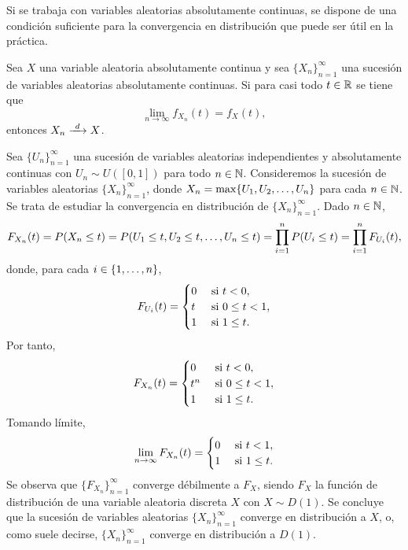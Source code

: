 \documentclass[a4paper, 11pt, extrafontsizes]{memoir}
\begin{document}
Si se trabaja con variables aleatorias absolutamente continuas, se dispone de una condición suficiente para la convergencia en distribución que puede ser útil en la práctica.

\begin{proposition}
    Sea $X$ una variable aleatoria absolutamente continua y sea $\{X_n\}_{n=1}^\infty$ una sucesión de variables aleatorias absolutamente continuas. Si para casi todo $t \in \mathbb R$ se tiene que
    \[\lim_{n \to \infty}f_{X_n}(t) = f_X(t),\]
    entonces $X_n \dconv X$.
\end{proposition}


\begin{example}
    Sea $\{U_n\}_{n=1}^\infty$ una sucesión de variables aleatorias independientes y absolutamente continuas con $U_n \sim U([0,1])$ para todo $n \in \mathbb N$. Consideremos la sucesión de variables aleatorias $\{X_n\}_{n=1}^\infty$, donde $X_n = \max\{U_1,U_2,\mathellipsis,U_n\}$ para cada $n \in \mathbb N$. Se trata de estudiar la convergencia en distribución de $\{X_n\}_{n=1}^\infty$. Dado $n \in \mathbb N$,
    \[F_{X_n}(t)=P(X_n \leq t) = P(U_1 \leq t, U_2 \leq t, \mathellipsis, U_n \leq t) = \prod_{i=1}^n P(U_i \leq t) = \prod_{i=1}^n F_{U_i}(t),\]
    donde, para cada $i \in \{1,\mathellipsis,n\}$,
    \[F_{U_i}(t) = \begin{cases}
        0 & $ si $ t < 0, \\
        t & $ si $ 0 \leq t < 1, \\
        1 & $ si $ 1 \leq t.
    \end{cases}\]
    Por tanto,
    \[F_{X_n}(t)= \begin{cases}
        0 & $ si $ t < 0, \\
        t^n & $ si $ 0 \leq t < 1, \\
        1 & $ si $ 1 \leq t.
    \end{cases}\]
    Tomando límite,
    \[\lim_{n \to \infty} F_{X_n}(t) =\begin{cases}
        0 & $ si $ t < 1, \\
        1 & $ si $ 1 \leq t. 
    \end{cases} \]
    Se observa que $\{F_{X_n}\}_{n=1}^\infty$ converge débilmente a $F_X$, siendo $F_X$ la función de distribución de una variable aleatoria discreta $X$ con $X \sim D(1)$. Se concluye que la sucesión de variables aleatorias $\{X_n\}_{n=1}^\infty$ converge en distribución a $X$, o, como suele decirse,  $\{X_n\}_{n=1}^\infty$ converge en distribución a $D(1)$.
\end{example}
\end{document}
